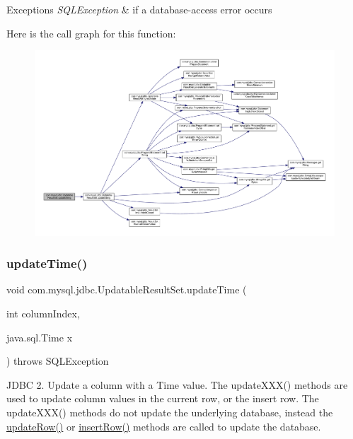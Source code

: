 \begin{DoxyExceptions}{Exceptions}
{\em S\+Q\+L\+Exception} & if a database-\/access error occurs \\
\hline
\end{DoxyExceptions}
Here is the call graph for this function\+:
\nopagebreak
\begin{figure}[H]
\begin{center}
\leavevmode
\includegraphics[width=350pt]{classcom_1_1mysql_1_1jdbc_1_1_updatable_result_set_a2d2c5c76d6479a6c82e680ea1bde42bc_cgraph}
\end{center}
\end{figure}
\mbox{\label{classcom_1_1mysql_1_1jdbc_1_1_updatable_result_set_a72c299ac228ddd995fe6f1499d5da439}} 
\subsubsection{\texorpdfstring{update\+Time()}{updateTime()}\hspace{0.1cm}{\footnotesize\ttfamily [1/2]}}
{\footnotesize\ttfamily void com.\+mysql.\+jdbc.\+Updatable\+Result\+Set.\+update\+Time (\begin{DoxyParamCaption}\item[{int}]{column\+Index,  }\item[{java.\+sql.\+Time}]{x }\end{DoxyParamCaption}) throws S\+Q\+L\+Exception}

J\+D\+BC 2. Update a column with a Time value. The update\+X\+X\+X() methods are used to update column values in the current row, or the insert row. The update\+X\+X\+X() methods do not update the underlying database, instead the \mbox{\hyperlink{classcom_1_1mysql_1_1jdbc_1_1_updatable_result_set_a919969ba4b3c7cbc7b18605e9f31a746}{update\+Row()}} or \mbox{\hyperlink{classcom_1_1mysql_1_1jdbc_1_1_updatable_result_set_aef041f8d9d0778083716fc26652648fa}{insert\+Row()}} methods are called to update the database.


